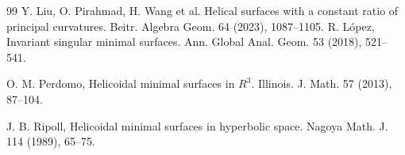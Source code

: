\documentclass[a4paper,12pt]{amsart}
\theoremstyle{definition}
\begin{document}
\begin{thebibliography}{99}
 Y. Liu, O. Pirahmad, H.  Wang  et al. Helical surfaces with a constant ratio of principal curvatures. Beitr. Algebra Geom. 64 (2023), 1087--1105. 
 R. L\'opez, Invariant singular minimal surfaces. Ann. Global Anal. Geom. 53 (2018), 521--541.


 O. M.   Perdomo,   Helicoidal minimal surfaces in $R^3$.  Illinois. J. Math. 57 (2013), 87--104.

 J. B. Ripoll,  Helicoidal minimal surfaces in hyperbolic space. Nagoya Math. J. 114 (1989), 65--75. 



 





 
 














\end{thebibliography}
 
\end{document}
